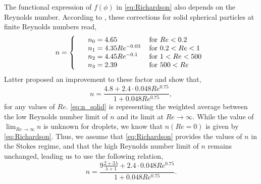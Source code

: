 The functional expression of $f(\phi)$ in \ref{eq:Richardson} also depends on the Reynolds number. 
According to \citet{richardson1997sedimentation}, these corrections for solid spherical particles at finite Reynolds numbers read, 
\begin{equation}
    n = \left\{
        \begin{tabular}{lll}
            &$n_0 =4.65$ & for $Re<0.2$\\ 
            &$n_1 = 4.35 Re^{-0.03}$ & for $0.2<Re<1$\\ 
            &$n_2 = 4.45 Re^{-0.1}$ & for $1<Re<500$\\ 
            &$n_3 = 2.39$ & for $500<Re$\\ 
        \end{tabular}
    \right.
\end{equation}
Latter \citet{kramer2019improvement} proposed an improvement to these factor and show that, 
\begin{equation}
    n = \frac{4.8 + 2.4 \cdot 0.048 Re^{0.75}}{1+0.048 Re^{0.75}},
    \label{eq:n_solid}
\end{equation} 
for any values of $Re$. 
\ref{eq:n_solid} is representing the weighted average between the low Reynolds number limit of  $n$ and its limit at $Re \to \infty$.  
While the value of $\lim_{Re\to\infty} n$ is unknown for droplets, we know that $n(Re = 0)$ is given by \ref{eq:Richardson}. 
Thus, we assume that \ref{eq:Richardson} provides the values of $n$ in the Stokes regime, and that the high Reynolds number limit of $n$ remains unchanged, leading us to use the following relation, 
\begin{equation}
    n = \frac{9 \frac{2+3\lambda}{\lambda+1} + 2.4 \cdot 0.048 Re^{0.75}}{1+0.048 Re^{0.75}}. 
    \label{eq:final_n}
\end{equation} 


